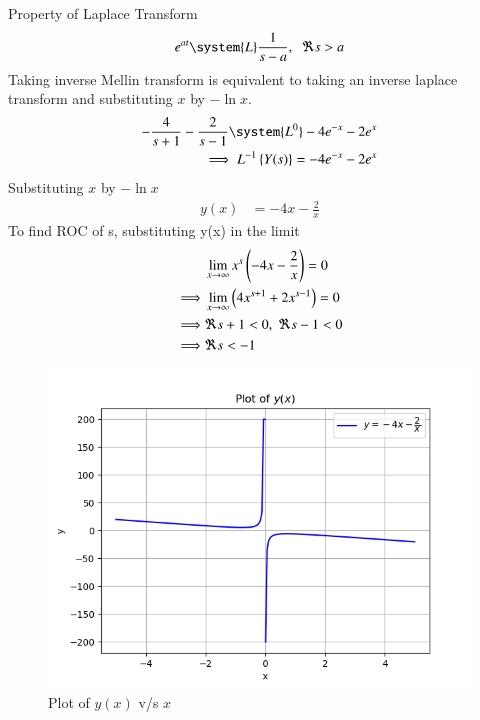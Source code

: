\documentclass[journal,12pt,twocolumn]{IEEEtran}
\theoremstyle{remark}
\begin{document}
Property of Laplace Transform 
\begin{align}
     e^{at} \system{L} \frac{1}{s-a},\;\; \Re s>a 
\end{align}
Taking inverse Mellin transform is equivalent to taking an inverse laplace transform and substituting $x$ by $-\ln x$.
\begin{align}
    -\frac{4}{s+1}-\frac{2}{s-1}\system{L^{0}} -4e^{-x}-2e^{x}\\
    \implies L^{-1} \cbrak{Y(s)} = -4e^{-x}-2e^{x}
\end{align}
Substituting $x$ by $-\ln x$
\begin{align}
    y(x)&=-4x-\frac{2}{x}
\end{align}
To find ROC of s, substituting y(x) in the limit
\begin{align} 
    &\lim_{x\rightarrow \infty} x^s \left(-4x-\frac{2}{x}\right)=0\\ \label{gateME49.eq:22}
    \implies& \lim_{x\rightarrow \infty} \left(4x^{s+1}+2x^{s-1}\right)=0\\
    \implies& \Re s+1<0,\;\Re s-1<0\\
    \implies& \Re s<-1\label{gateME49.eq:26}
\end{align}

\begin{figure}[h]
    \centering
    \includegraphics[width=\columnwidth]{figs/fig.png}
    \caption{Plot of $y(x)$ v/s $x$}
\end{figure}
\end{document}
